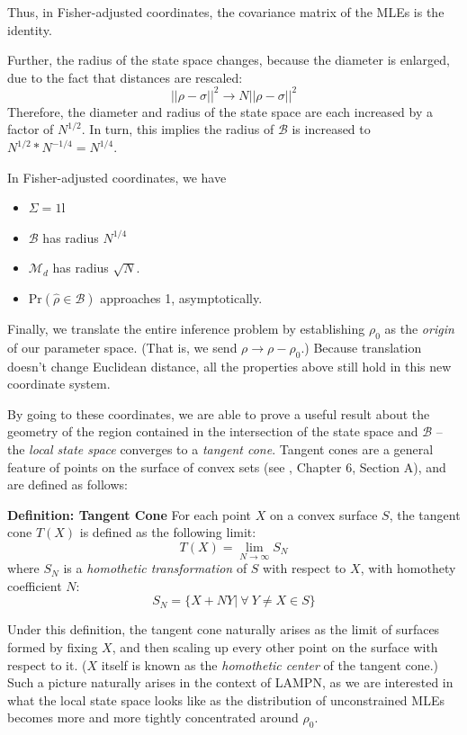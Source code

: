 \documentclass[aps,pra, twocolumn]{revtex4-1}
\newcommand{\M}{\mathcal{M}}
\newcommand{\Id}{\mathbb{I}}
\def\Id{1\!\mathrm{l}}
\begin{document}
 Thus, in Fisher-adjusted coordinates, the covariance matrix of the MLEs is the identity.

Further, the radius of the state space changes, because the diameter is enlarged, due to the fact that distances are rescaled:
\[||\rho - \sigma||^{2} \rightarrow N||\rho - \sigma||^{2}\]
Therefore, the diameter and radius of the state space are each increased by a factor of $N^{1/2}$. In turn, this implies the radius of $\mathcal{B}$ is increased to $N^{1/2}*N^{-1/4} = N^{1/4}$.

In Fisher-adjusted coordinates, we have

 \begin{itemize}
 \item $\Sigma = \Id$
 \item $\mathcal{B}$ has radius $N^{1/4}$
 \item $\M_{d}$ has radius $\sqrt{N}$.
 \item $\mathrm{Pr}\left(\hat{\rho} \in \mathcal{B}\right)$ approaches 1, asymptotically.
 \end{itemize}

Finally, we translate the entire inference problem by establishing $\rho_{0}$ as the \emph{origin} of our parameter space. (That is, we send $\rho \rightarrow \rho - \rho_{0}$.) Because translation doesn't change Euclidean distance, all the properties above still hold in this new coordinate system.

By going to these coordinates, we are able to prove a useful result about the geometry of the region contained in the intersection of the state space and $\mathcal{B}$ --  the \emph{local state space} converges to a \emph{tangent cone}. Tangent cones are a general feature of points on the surface of convex sets (see \cite{Rockafellar1998}, Chapter 6, Section A), and are defined as follows:

\textbf{Definition: Tangent Cone} 
For each point $X$ on a convex surface $S$, the tangent cone $T(X)$ is defined as the following limit:
\[T(X) = \lim_{N\rightarrow \infty} S_{N}\]
where $S_{N}$ is a \emph{homothetic transformation} of $S$ with respect to $X$, with homothety coefficient $N$:
\[S_{N} = \{X + NY  |~\forall ~Y \neq X \in S\}\]

Under this definition, the tangent cone naturally arises as the limit of surfaces formed by fixing $X$, and then scaling up every other point on the surface with respect to it. ($X$ itself is known as the \emph{homothetic center} of the tangent cone.) Such a picture naturally arises in the context of LAMPN, as we are interested in what the local state space looks like as the distribution of unconstrained MLEs becomes more and more tightly concentrated around $\rho_{0}$.
\end{document}
